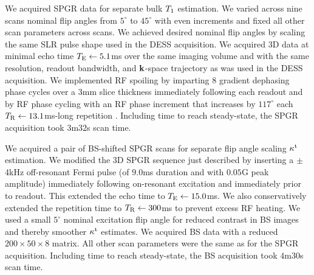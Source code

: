 We acquired SPGR data
for separate bulk $T_1$ estimation.
We varied across nine scans nominal flip angles 
from $5^\circ$ to $45^\circ$
with even increments
and fixed all other scan parameters across scans.
We achieved desired nominal flip angles
by scaling the same SLR pulse shape 
used in the DESS acquisition.
We acquired 3D data
at minimal echo time $T_\mathrm{E} \gets 5.1$ms
over the same imaging volume
and with the same resolution, readout bandwidth, and $\mathbf{k}$-space trajectory
as was used in the DESS acquisition.
We implemented RF spoiling
by imparting $8$ gradient dephasing phase cycles
over a $3$mm slice thickness 
immediately following each readout
and by RF phase cycling 
with an RF phase increment 
that increases by $117^\circ$ 
each $T_\mathrm{R} \gets 13.1$ms-long repetition \cite{zur:91:sot}.
Including time to reach steady-state,
the SPGR acquisition took $3$m$32$s scan time.

We acquired a pair 
of BS-shifted SPGR scans \cite{sacolick:10:bmb}
for separate flip angle scaling $\kappa^{\mathrm{t}}$ estimation.
We modified the 3D SPGR sequence just described
by inserting a $\pm$4kHz off-resonant Fermi pulse
(of $9.0$ms duration
and with $0.05$G peak amplitude)
immediately following on-resonant excitation
and immediately prior to readout.
This extended the echo time to $T_\mathrm{E} \gets 15.0$ms.
We also conservatively extended the repetition time to $T_\mathrm{R} \gets 300$ms
to prevent excess RF heating.
We used a small $5^\circ$ nominal excitation flip angle
for reduced contrast in BS images
and thereby smoother $\kappa^{\mathrm{t}}$ estimates.
We acquired BS data
with a reduced $200\times50\times8$ matrix.
All other scan parameters were the same as for the SPGR acquisition.
Including time to reach steady-state,
the BS acquisition took $4$m$30$s scan time.


